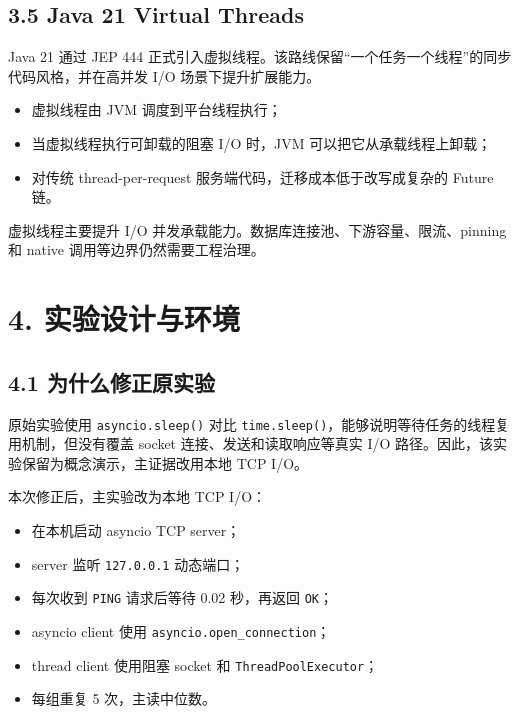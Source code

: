 \documentclass[
  11pt,
  a4paper,
]{article}
\providecommand{\tightlist}{%
  \setlength{\itemsep}{0pt}\setlength{\parskip}{0pt}}
\begin{document}
\subsection{3.5 Java 21 Virtual Threads}\label{java-21-virtual-threads}

Java 21 通过 JEP 444
正式引入虚拟线程。该路线保留``一个任务一个线程''的同步代码风格，并在高并发
I/O 场景下提升扩展能力。

\begin{itemize}
\tightlist
\item
  虚拟线程由 JVM 调度到平台线程执行；
\item
  当虚拟线程执行可卸载的阻塞 I/O 时，JVM 可以把它从承载线程上卸载；
\item
  对传统 thread-per-request 服务端代码，迁移成本低于改写成复杂的 Future
  链。
\end{itemize}

虚拟线程主要提升 I/O 并发承载能力。数据库连接池、下游容量、限流、pinning
和 native 调用等边界仍然需要工程治理。

\section{4.
实验设计与环境}\label{ux5b9eux9a8cux8bbeux8ba1ux4e0eux73afux5883}

\subsection{4.1
为什么修正原实验}\label{ux4e3aux4ec0ux4e48ux4feeux6b63ux539fux5b9eux9a8c}

原始实验使用 \texttt{asyncio.sleep()} 对比
\texttt{time.sleep()}，能够说明等待任务的线程复用机制，但没有覆盖 socket
连接、发送和读取响应等真实 I/O
路径。因此，该实验保留为概念演示，主证据改用本地 TCP I/O。

本次修正后，主实验改为本地 TCP I/O：

\begin{itemize}
\tightlist
\item
  在本机启动 asyncio TCP server；
\item
  server 监听 \texttt{127.0.0.1} 动态端口；
\item
  每次收到 \texttt{PING} 请求后等待 0.02 秒，再返回 \texttt{OK}；
\item
  asyncio client 使用 \texttt{asyncio.open\_connection}；
\item
  thread client 使用阻塞 socket 和 \texttt{ThreadPoolExecutor}；
\item
  每组重复 5 次，主读中位数。
\end{itemize}
\end{document}

